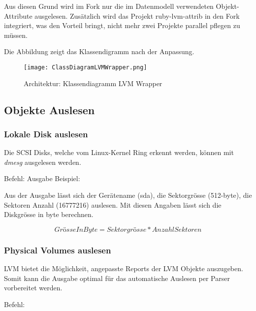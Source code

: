 Aus diesen Grund wird im Fork nur die im Datenmodell verwendeten Objekt-Attribute ausgelesen. Zusätzlich wird das Projekt ruby-lvm-attrib in den Fork integriert, was den Vorteil bringt, nicht mehr zwei Projekte parallel pflegen zu müssen.

Die Abbildung  zeigt das Klassendigramm nach der Anpassung.

\begin{figure}
\centering
\texttt{[image: ClassDiagramLVMWrapper.png]}
\caption{Architektur: Klassendiagramm LVM Wrapper}
\label{fig:Classdiagramm}
\end{figure}

\subsection{Objekte Auslesen}
\subsubsection{Lokale Disk auslesen}
 
Die SCSI Disks, welche vom Linux-Kernel Ring erkennt werden, können mit \textit{dmesg} ausgelesen werden.

Befehl:\newline 
{}
Ausgabe Beispiel:\newline
{}

Aus der Ausgabe lässt sich der Gerätename (sda), die Sektorgrösse (512-byte), die Sektoren Anzahl (16777216) auslesen. Mit diesen Angaben lässt sich die Diskgrösse in byte berechnen.

\begin{equation}
Grösse In Byte = Sektorgrösse * Anzahl Sektoren
\end{equation}

\subsubsection{Physical Volumes auslesen}

LVM bietet die Möglichkeit, angepasste Reports der LVM Objekte auszugeben. Somit kann die Ausgabe optimal für das automatische Auslesen per Parser vorbereitet werden.

Befehl:\newline
{}

